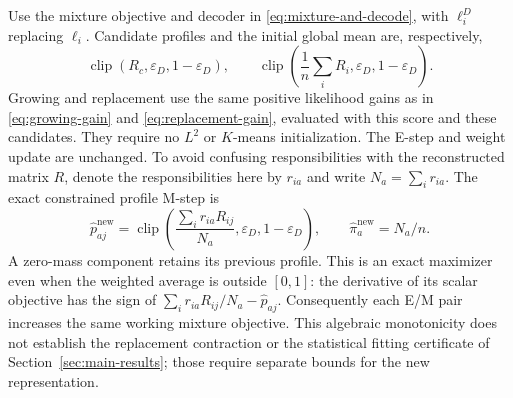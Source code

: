 \documentclass[11pt]{article}
\theoremstyle{definition}
\theoremstyle{remark}
\numberwithin{equation}{section}
\begin{document}
Use the mixture objective and decoder in \eqref{eq:mixture-and-decode},
with $\ell_i^D$ replacing $\ell_i$. Candidate profiles and the initial
global mean are, respectively,
\begin{equation}
 \operatorname{clip}(R_c,\varepsilon_D,1-\varepsilon_D),
 \qquad
 \operatorname{clip}\left(\frac1n\sum_iR_i,
                     \varepsilon_D,1-\varepsilon_D\right).
 \label{eq:degree-candidates}
\end{equation}
Growing and replacement use the same positive likelihood gains as in
\eqref{eq:growing-gain} and \eqref{eq:replacement-gain}, evaluated with
this score and these candidates. They require no $L^2$ or $K$-means
initialization. The E-step and weight update are unchanged. To avoid
confusing responsibilities with the reconstructed matrix $R$, denote the
responsibilities here by $r_{ia}$ and write $N_a=\sum_i r_{ia}$. The exact
constrained profile M-step is
\begin{equation}
 \widehat p_{aj}^{\mathrm{new}}
  =\operatorname{clip}\left(
      \frac{\sum_i r_{ia}R_{ij}}{N_a},
      \varepsilon_D,1-\varepsilon_D\right),
 \qquad \widehat\pi_a^{\mathrm{new}}=N_a/n.
 \label{eq:degree-mstep}
\end{equation}
A zero-mass component retains its previous profile. This is an exact
maximizer even when the weighted average is outside $[0,1]$: the derivative
of its scalar objective has the sign of
$\sum_i r_{ia}R_{ij}/N_a-\widehat p_{aj}$. Consequently each E/M pair
increases the same working mixture objective. This algebraic monotonicity
does not establish the replacement contraction or the statistical fitting
certificate of Section~\ref{sec:main-results}; those require separate
bounds for the new representation.

\begin{center}
\end{center}
\end{document}
